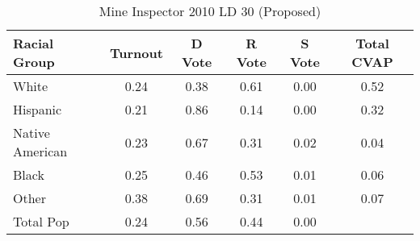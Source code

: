 \begin{table}[htb]
\begin{center}
\caption{Mine Inspector 2010 LD 30 (Proposed)}
\label{smine_cvap_ld_30}
\begin{tabular}{lccccc}
  \hline
Racial Group & Turnout & D Vote & R Vote & S Vote & Total CVAP \\ 
  \hline
White & 0.24 & 0.38 & 0.61 & 0.00 & 0.52 \\ 
  Hispanic & 0.21 & 0.86 & 0.14 & 0.00 & 0.32 \\ 
  Native American & 0.23 & 0.67 & 0.31 & 0.02 & 0.04 \\ 
  Black & 0.25 & 0.46 & 0.53 & 0.01 & 0.06 \\ 
  Other & 0.38 & 0.69 & 0.31 & 0.01 & 0.07 \\ 
  Total Pop & 0.24 & 0.56 & 0.44 & 0.00 &  \\ 
   \hline
\end{tabular}
\end{center}
\end{table}
